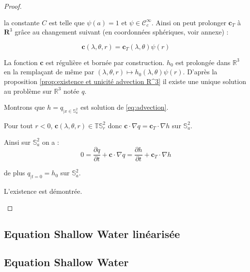 \begin{proof}
\begin{itemize}
la constante $C$ est telle que $\psi(a)=1$ et $\psi \in \mathcal{C}^{\infty}_c$.
Ainsi on peut prolonger $\mathbf{c}_T$ à $\mathbf{R}^3$ grâce au changement suivant (en coordonnées sphériques, voir annexe) :

\begin{equation}
\mathbf{c}(\lambda, \theta, r) = \mathbf{c}_T(\lambda, \theta) \psi(r)
\end{equation}

La fonction $\mathbf{c}$ est régulière et bornée par construction.
 $h_0$ est prolongée dans $\mathbb{R}^3$ en la remplaçant de même par $(\lambda, \theta, r) \mapsto h_0(\lambda, \theta) \psi(r)$. D'après la proposition \ref{prop:existence et unicité advection R^3} il existe une unique solution au problème sur $\mathbb{R}^3$ notée $q$.
 
 Montrons que $h=q_{|x\in\mathbb{S}_a^2}$ est solution de \eqref{eq:advection}.
 
 Pour tout $r<0$, $\mathbf{c}(\lambda, \theta, r) \in \mathbb{T}\mathbb{S}_r^2$ donc $\mathbf{c} \cdot \nabla q = \mathbf{c}_T \cdot \nabla h$ sur $\mathbb{S}_a^2$.
 
 Ainsi sur $\mathbb{S}_a^2$ on a :
 \begin{equation}
 0 = \dfrac{\partial q}{\partial t} + \mathbf{c} \cdot \nabla q = \dfrac{\partial h}{\partial t} + \mathbf{c}_T \cdot \nabla h
 \end{equation}
 
 de plus $q_{|t=0}=h_0$ sur $\mathbb{S}_a^2$.
 
 L'existence est démontrée.


\end{itemize}

\end{proof}


\subsection{Equation Shallow Water linéarisée}

\subsection{Equation Shallow Water}




